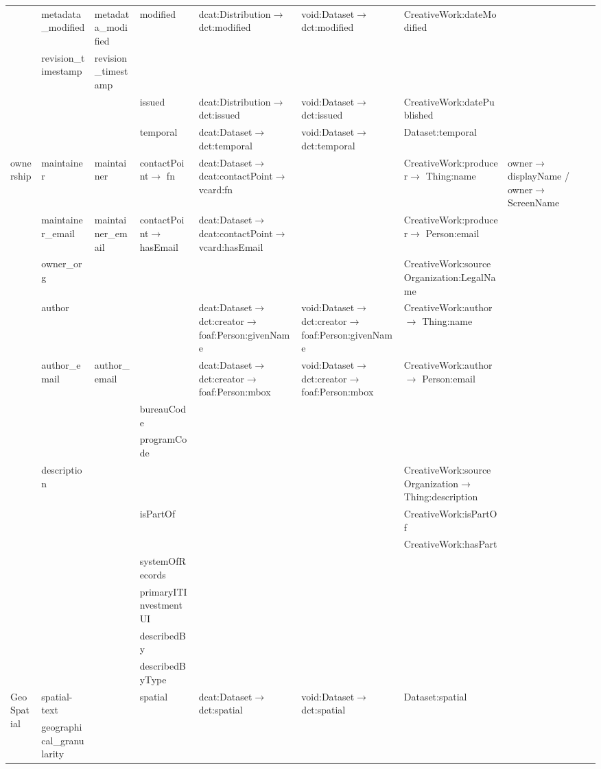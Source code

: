 \documentclass[runningheads,a4paper]{llncs}
\begin{document}
\begin{landscape}
{\begin{longtable}{|p{1cm}|m{2.3cm}|m{2.2cm}|m{2.5cm}|p{3.6cm}|m{3.6cm}|m{3.6cm}|m{2.5cm}|}
 & metadata\_modified & metadata\_modified & modified & dcat:Distribution$\rightarrow$ dct:modified & void:Dataset$\rightarrow$ dct:modified & CreativeWork:dateModified & \tabularnewline
\cline{2-8}
 & revision\_timestamp & revision\_timestamp &  &  &  &  & \tabularnewline
\cline{2-8}
 &  &  & issued & dcat:Distribution$\rightarrow$ dct:issued & void:Dataset$\rightarrow$ dct:issued & CreativeWork:datePublished & \tabularnewline
\cline{2-8}
 &  &  & temporal & dcat:Dataset$\rightarrow$ dct:temporal & void:Dataset$\rightarrow$ dct:temporal & Dataset:temporal & \tabularnewline
\hline
\multirow{14}{2cm}{ownership} & maintainer & maintainer & contactPoint$\rightarrow$ fn & dcat:Dataset$\rightarrow$ dcat:contactPoint$\rightarrow$ vcard:fn &  & CreativeWork:producer$\rightarrow$ Thing:name & owner$\rightarrow$ displayName / owner$\rightarrow$ ScreenName\tabularnewline
\cline{2-8}
 & maintainer\_email & maintainer\_email & contactPoint$\rightarrow$ hasEmail & dcat:Dataset$\rightarrow$ dcat:contactPoint$\rightarrow$ vcard:hasEmail &  & CreativeWork:producer$\rightarrow$ Person:email & \tabularnewline
\cline{2-8}
 & owner\_org &  &  &  &  & CreativeWork:sourceOrganization:LegalName & \tabularnewline
\cline{2-8}
 & author &  &  & dcat:Dataset$\rightarrow$ dct:creator$\rightarrow$ foaf:Person:givenName & void:Dataset$\rightarrow$ dct:creator$\rightarrow$ foaf:Person:givenName & CreativeWork:author$\rightarrow$ Thing:name & \tabularnewline
\cline{2-8}
 & author\_email & author\_email &  & dcat:Dataset$\rightarrow$ dct:creator$\rightarrow$ foaf:Person:mbox & void:Dataset$\rightarrow$ dct:creator$\rightarrow$ foaf:Person:mbox & CreativeWork:author$\rightarrow$ Person:email & \tabularnewline
\cline{2-8}
 &  &  & bureauCode &  &  &  & \tabularnewline
\cline{2-8}
 &  &  & programCode &  &  &  & \tabularnewline
\cline{2-8}
 & description &  &  &  &  & CreativeWork:sourceOrganization$\rightarrow$ Thing:description & \tabularnewline
\cline{2-8}
 &  &  & isPartOf &  &  & CreativeWork:isPartOf & \tabularnewline
\cline{2-8}
 &  &  &  &  &  & CreativeWork:hasPart & \tabularnewline
\cline{2-8}
 &  &  & systemOfRecords &  &  &  & \tabularnewline
\cline{2-8}
 &  &  & primaryITInvestmentUI &  &  &  & \tabularnewline
\cline{2-8}
 &  &  & describedBy &  &  &  & \tabularnewline
\cline{2-8}
 &  &  & describedByType &  &  &  & \tabularnewline
\hline
\multirow{6}{2cm}{GeoSpatial} & spatial-text &  & spatial & dcat:Dataset$\rightarrow$ dct:spatial & void:Dataset$\rightarrow$ dct:spatial & Dataset:spatial & \tabularnewline
\cline{2-8}
 & geographical\_granularity &  &  &  &  &  & \tabularnewline

\end{longtable}}
\end{landscape}
\end{document}

